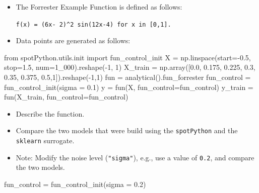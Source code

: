 \documentclass[
  letterpaper,
  DIV=11,
  numbers=noendperiod]{scrreprt}
\newenvironment{Shaded}{\begin{snugshade}}{\end{snugshade}}
\newcommand{\DecValTok}[1]{\textcolor[rgb]{0.68,0.00,0.00}{#1}}
\newcommand{\FloatTok}[1]{\textcolor[rgb]{0.68,0.00,0.00}{#1}}
\newcommand{\ImportTok}[1]{\textcolor[rgb]{0.00,0.46,0.62}{#1}}
\newcommand{\NormalTok}[1]{\textcolor[rgb]{0.00,0.23,0.31}{#1}}
\newcommand{\OperatorTok}[1]{\textcolor[rgb]{0.37,0.37,0.37}{#1}}
\providecommand{\tightlist}{%
  \setlength{\itemsep}{0pt}\setlength{\parskip}{0pt}}\usepackage{longtable,booktabs,array}
\begin{document}
\begin{itemize}
\item
  The Forrester Example Function is defined as follows:

  \texttt{f(x)\ =\ (6x-\ 2)\^{}2\ sin(12x-4)\ for\ x\ in\ {[}0,1{]}.}
\item
  Data points are generated as follows:
\end{itemize}

\begin{Shaded}
\begin{Highlighting}[]
\ImportTok{from}\NormalTok{ spotPython.utils.init }\ImportTok{import}\NormalTok{ fun\_control\_init}
\NormalTok{X }\OperatorTok{=}\NormalTok{ np.linspace(start}\OperatorTok{={-}}\FloatTok{0.5}\NormalTok{, stop}\OperatorTok{=}\FloatTok{1.5}\NormalTok{, num}\OperatorTok{=}\DecValTok{1\_000}\NormalTok{).reshape(}\OperatorTok{{-}}\DecValTok{1}\NormalTok{, }\DecValTok{1}\NormalTok{)}
\NormalTok{X\_train }\OperatorTok{=}\NormalTok{ np.array([}\FloatTok{0.0}\NormalTok{, }\FloatTok{0.175}\NormalTok{, }\FloatTok{0.225}\NormalTok{, }\FloatTok{0.3}\NormalTok{, }\FloatTok{0.35}\NormalTok{, }\FloatTok{0.375}\NormalTok{, }\FloatTok{0.5}\NormalTok{,}\DecValTok{1}\NormalTok{]).reshape(}\OperatorTok{{-}}\DecValTok{1}\NormalTok{,}\DecValTok{1}\NormalTok{)}
\NormalTok{fun }\OperatorTok{=}\NormalTok{ analytical().fun\_forrester}
\NormalTok{fun\_control }\OperatorTok{=}\NormalTok{ fun\_control\_init(sigma }\OperatorTok{=} \FloatTok{0.1}\NormalTok{)}
\NormalTok{y }\OperatorTok{=}\NormalTok{ fun(X, fun\_control}\OperatorTok{=}\NormalTok{fun\_control)}
\NormalTok{y\_train }\OperatorTok{=}\NormalTok{ fun(X\_train, fun\_control}\OperatorTok{=}\NormalTok{fun\_control)}
\end{Highlighting}
\end{Shaded}

\begin{itemize}
\tightlist
\item
  Describe the function.
\item
  Compare the two models that were build using the \texttt{spotPython}
  and the \texttt{sklearn} surrogate.
\item
  Note: Modify the noise level (\texttt{"sigma"}), e.g., use a value of
  \texttt{0.2}, and compare the two models.
\end{itemize}

\begin{Shaded}
\begin{Highlighting}[]
\NormalTok{fun\_control }\OperatorTok{=}\NormalTok{ fun\_control\_init(sigma }\OperatorTok{=} \FloatTok{0.2}\NormalTok{)}
\end{Highlighting}
\end{Shaded}
\end{document}
